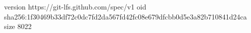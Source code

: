 version https://git-lfs.github.com/spec/v1
oid sha256:1f30469b33df72c0dc7fd2da567fd42fc08e679dfcbb0d5e3a82b710841d24ca
size 8022
